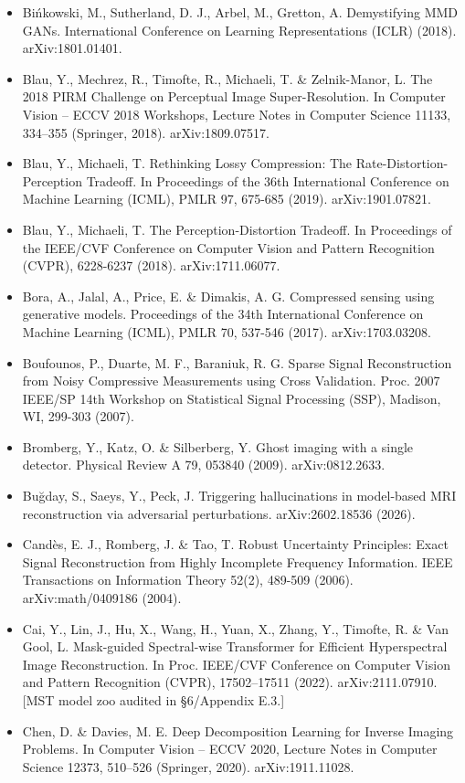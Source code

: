 \documentclass[11pt]{article}
\begin{document}
\begin{itemize}
\item Bińkowski, M., Sutherland, D. J., Arbel, M., Gretton, A. Demystifying MMD GANs. International Conference on Learning Representations (ICLR) (2018). arXiv:1801.01401.
\item Blau, Y., Mechrez, R., Timofte, R., Michaeli, T. \& Zelnik-Manor, L. The 2018 PIRM Challenge on Perceptual Image Super-Resolution. In Computer Vision -- ECCV 2018 Workshops, Lecture Notes in Computer Science 11133, 334--355 (Springer, 2018). arXiv:1809.07517.
\item Blau, Y., Michaeli, T. Rethinking Lossy Compression: The Rate-Distortion-Perception Tradeoff. In Proceedings of the 36th International Conference on Machine Learning (ICML), PMLR 97, 675-685 (2019). arXiv:1901.07821.
\item Blau, Y., Michaeli, T. The Perception-Distortion Tradeoff. In Proceedings of the IEEE/CVF Conference on Computer Vision and Pattern Recognition (CVPR), 6228-6237 (2018). arXiv:1711.06077.
\item Bora, A., Jalal, A., Price, E. \& Dimakis, A. G. Compressed sensing using generative models. Proceedings of the 34th International Conference on Machine Learning (ICML), PMLR 70, 537-546 (2017). arXiv:1703.03208.
\item Boufounos, P., Duarte, M. F., Baraniuk, R. G. Sparse Signal Reconstruction from Noisy Compressive Measurements using Cross Validation. Proc. 2007 IEEE/SP 14th Workshop on Statistical Signal Processing (SSP), Madison, WI, 299-303 (2007).
\item Bromberg, Y., Katz, O. \& Silberberg, Y. Ghost imaging with a single detector. Physical Review A 79, 053840 (2009). arXiv:0812.2633.
\item Buğday, S., Saeys, Y., Peck, J. Triggering hallucinations in model-based MRI reconstruction via adversarial perturbations. arXiv:2602.18536 (2026).
\item Candès, E. J., Romberg, J. \& Tao, T. Robust Uncertainty Principles: Exact Signal Reconstruction from Highly Incomplete Frequency Information. IEEE Transactions on Information Theory 52(2), 489-509 (2006). arXiv:math/0409186 (2004).
\item Cai, Y., Lin, J., Hu, X., Wang, H., Yuan, X., Zhang, Y., Timofte, R. \& Van Gool, L. Mask-guided Spectral-wise Transformer for Efficient Hyperspectral Image Reconstruction. In Proc. IEEE/CVF Conference on Computer Vision and Pattern Recognition (CVPR), 17502--17511 (2022). arXiv:2111.07910. [MST model zoo audited in §6/Appendix E.3.]
\item Chen, D. \& Davies, M. E. Deep Decomposition Learning for Inverse Imaging Problems. In Computer Vision -- ECCV 2020, Lecture Notes in Computer Science 12373, 510--526 (Springer, 2020). arXiv:1911.11028.

\end{itemize}
\end{document}
